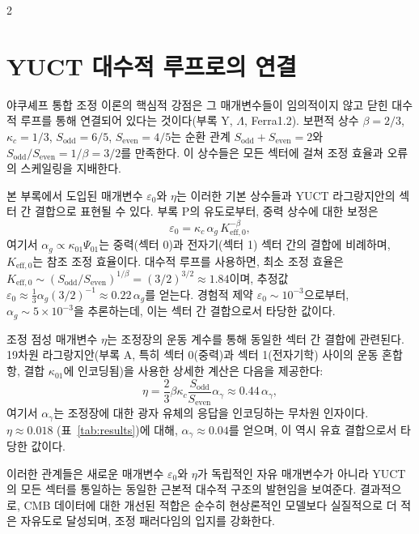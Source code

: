 \documentclass[11pt,a4paper]{article}
\begin{document}
\begin{multicols}{2}
		\section{YUCT 대수적 루프로의 연결}
		\label{sec:algebraic}
		
		야쿠셰프 통합 조정 이론의 핵심적 강점은 그 매개변수들이 임의적이지 않고 닫힌 대수적 루프를 통해 연결되어 있다는 것이다(부록 Y, $\Lambda$, Ferra1.2). 보편적 상수 $\beta=2/3$, $\kappa_c=1/3$, $S_{\mathrm{odd}}=6/5$, $S_{\mathrm{even}}=4/5$는 순환 관계 $S_{\mathrm{odd}}+S_{\mathrm{even}}=2$와 $S_{\mathrm{odd}}/S_{\mathrm{even}} = 1/\beta = 3/2$를 만족한다. 이 상수들은 모든 섹터에 걸쳐 조정 효율과 오류의 스케일링을 지배한다.
		
		본 부록에서 도입된 매개변수 $\varepsilon_0$와 $\eta$는 이러한 기본 상수들과 YUCT 라그랑지안의 섹터 간 결합으로 표현될 수 있다. 부록 P의 유도로부터, 중력 상수에 대한 보정은
		\begin{equation}
			\varepsilon_0 = \kappa_c \, \alpha_g \, K_{\mathrm{eff},0}^{-\beta},
		\end{equation}
		여기서 $\alpha_g \propto \kappa_{01} \Psi_{01}$는 중력(섹터 0)과 전자기(섹터 1) 섹터 간의 결합에 비례하며, $K_{\mathrm{eff},0}$는 참조 조정 효율이다. 대수적 루프를 사용하면, 최소 조정 효율은 $K_{\mathrm{eff},0} \sim (S_{\mathrm{odd}}/S_{\mathrm{even}})^{1/\beta} = (3/2)^{3/2} \approx 1.84$이며, 추정값 $\varepsilon_0 \approx \frac{1}{3} \alpha_g (3/2)^{-1} \approx 0.22\,\alpha_g$를 얻는다. 경험적 제약 $\varepsilon_0 \sim 10^{-3}$으로부터, $\alpha_g \sim 5\times10^{-3}$을 추론하는데, 이는 섹터 간 결합으로서 타당한 값이다.
		
		조정 점성 매개변수 $\eta$는 조정장의 운동 계수를 통해 동일한 섹터 간 결합에 관련된다. 19차원 라그랑지안(부록 A, 특히 섹터 0(중력)과 섹터 1(전자기학) 사이의 운동 혼합 항, 결합 $\kappa_{01}$에 인코딩됨)을 사용한 상세한 계산은 다음을 제공한다:
		\begin{equation}
			\eta = \frac{2}{3} \beta \kappa_c \frac{S_{\mathrm{odd}}}{S_{\mathrm{even}}} \alpha_\gamma \approx 0.44 \, \alpha_\gamma,
		\end{equation}
		여기서 $\alpha_\gamma$는 조정장에 대한 광자 유체의 응답을 인코딩하는 무차원 인자이다. $\eta \approx 0.018$ (표~\ref{tab:results})에 대해, $\alpha_\gamma \approx 0.04$를 얻으며, 이 역시 유효 결합으로서 타당한 값이다.
		
		이러한 관계들은 새로운 매개변수 $\varepsilon_0$와 $\eta$가 독립적인 자유 매개변수가 아니라 YUCT의 모든 섹터를 통일하는 동일한 근본적 대수적 구조의 발현임을 보여준다. 결과적으로, CMB 데이터에 대한 개선된 적합은 순수히 현상론적인 모델보다 실질적으로 더 적은 자유도로 달성되며, 조정 패러다임의 입지를 강화한다.
		
	\end{multicols}
	
\end{document}
